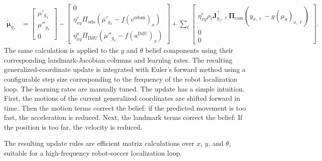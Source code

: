 {
\small
\begin{align}
\dot{\tilde{\boldsymbol{\mu}}}_{g_x}
&\!=\!
\begin{bmatrix}
\mu'_{g_x}\\
\mu''_{g_x}\\
0
\end{bmatrix}
\!-\!
\begin{bmatrix}
0\\
\eta^{v}_{xy}\Pi_{\mathrm{odo}}
\left(\mu'_{g_x}-f(v^{\mathrm{odom}})_x\right)\\
\eta^{a}_{xy}\Pi_{\mathrm{IMU}}
\left(\mu''_{g_x}-f(a^{\mathrm{IMU}})_x\right)
\end{bmatrix}
\!+\!
\sum_{\ell}
\begin{bmatrix}
\eta^{c}_{xy}
\rho_\ell \boldsymbol{J}_{g_x,\ell}^{\top}
\boldsymbol{\Pi}_{\mathrm{cam}}
\left(y_{x,\ell}-g(\mu_g)_{x,\ell}\right)\\
0\\
0
\end{bmatrix}.
\end{align}
}
The same calculation is applied to the $y$ and $\theta$ belief components using their corresponding landmark-Jacobian columns and learning rates. The resulting generalized-coordinate update is integrated with Euler's forward method using a configurable step size corresponding to the frequency of the robot localization loop. The learning rates are manually tuned. The update has a simple intuition. First, the motions of the current generalized coordinates are shifted forward in time. Then the motion terms correct the belief: if the predicted movement is too fast, the acceleration is reduced. Next, the landmark terms correct the belief: If the position is too far, the velocity is reduced.

 The resulting update rules are efficient matrix calculations over $x$, $y$, and $\theta$, suitable for a high-frequency robot-soccer localization loop.
